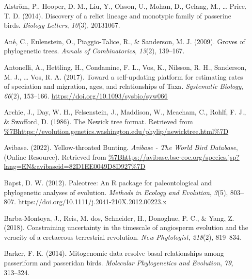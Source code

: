 \documentclass[
  man]{apa6}
\newlength{\cslhangindent}
\newlength{\cslentryspacingunit} %
\newenvironment{CSLReferences}[2] %
 {%
  \setlength{\parindent}{0pt}
  \ifodd #1
  \let\oldpar\par
  \def\par{\hangindent=\cslhangindent\oldpar}
  \fi
  \setlength{\parskip}{#2\cslentryspacingunit}
 }%
 {}
\begin{document}
\hypertarget{refs}{}
\begin{CSLReferences}{1}{0}
\leavevmode{}%
Alström, P., Hooper, D. M., Liu, Y., Olsson, U., Mohan, D., Gelang, M., \ldots{} Price, T. D. (2014). Discovery of a relict lineage and monotypic family of passerine birds. \emph{Biology Letters}, \emph{10}(3), 20131067.

\leavevmode{}%
Ané, C., Eulenstein, O., Piaggio-Talice, R., \& Sanderson, M. J. (2009). Groves of phylogenetic trees. \emph{{Annals of Combinatorics}}, \emph{13}(2), 139--167.

\leavevmode{}%
Antonelli, A., Hettling, H., Condamine, F. L., Vos, K., Nilsson, R. H., Sanderson, M. J., \ldots{} Vos, R. A. (2017). {Toward a self-updating platform for estimating rates of speciation and migration, ages, and relationships of Taxa}. \emph{Systematic Biology}, \emph{66}(2), 153--166. \url{https://doi.org/10.1093/sysbio/syw066}

\leavevmode{}%
Archie, J., Day, W. H., Felsenstein, J., Maddison, W., Meacham, C., Rohlf, F. J., \& Swofford, D. (1986). {The Newick tree format}. Retrieved from \url{\%7Bhttps://evolution.genetics.washington.edu/phylip/newicktree.html\%7D}

\leavevmode{}%
Avibase. (2022). {Yellow-throated Bunting}. \emph{{Avibase - The World Bird Database}}, (Online Resource). Retrieved from \url{\%7Bhttps://avibase.bsc-eoc.org/species.jsp?lang=EN\&avibaseid=82D1EE0049D8D927\%7D}

\leavevmode{}%
Bapst, D. W. (2012). {Paleotree: An R package for paleontological and phylogenetic analyses of evolution}. \emph{{Methods in Ecology and Evolution}}, \emph{3}(5), 803--807. \url{https://doi.org/10.1111/j.2041-210X.2012.00223.x}

\leavevmode{}%
Barba-Montoya, J., Reis, M. dos, Schneider, H., Donoghue, P. C., \& Yang, Z. (2018). Constraining uncertainty in the timescale of angiosperm evolution and the veracity of a cretaceous terrestrial revolution. \emph{New Phytologist}, \emph{218}(2), 819--834.

\leavevmode{}%
Barker, F. K. (2014). Mitogenomic data resolve basal relationships among passeriform and passeridan birds. \emph{Molecular Phylogenetics and Evolution}, \emph{79}, 313--324.


\end{CSLReferences}
\end{document}
